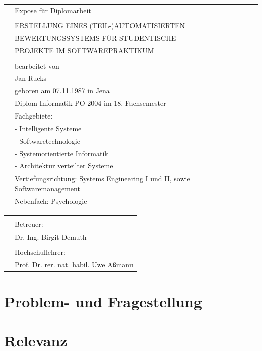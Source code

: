 \documentclass[a4paper,pointlessnumbers]{article}
\newcommand{\dinBoldXVI}{\fontencoding{OT1}\fontfamily{din}\fontseries{b}\fontsize{16pt}{19.2pt}\selectfont}
\begin{document}
\begin{titlepage}
	\begin{tabularx}{\textwidth}{@{}p{8mm}X}
	  & \univLightXI Expose für Diplomarbeit \\
	  & \\
	  & \LARGE\dinBoldXVI\MakeUppercase{Erstellung eines (teil-)automatisierten} \\   
	  & \LARGE\dinBoldXVI\MakeUppercase{Bewertungssystems für studentische} \\
	  & \LARGE\dinBoldXVI\MakeUppercase{Projekte im Softwarepraktikum} \\
	  & \\
	  & \univLightIX bearbeitet von \\
	  & \univLightXI Jan Rucks \\
	  & \univLightIX geboren am 07.11.1987 in Jena \\
	  & \univLightIX Diplom Informatik PO 2004 im 18. Fachsemester \\
	  & \univLightIX Fachgebiete: \\ 
	  & \univLightIX - Intelligente Systeme \\
	  & \univLightIX - Softwaretechnologie \\
	  & \univLightIX - Systemorientierte Informatik \\
	  & \univLightIX - Architektur verteilter Systeme \\
	  & \univLightIX Vertiefungsrichtung: Systems Engineering I und II, sowie Softwaremanagement \\ 
	  & \univLightIX Nebenfach: Psychologie \\
	\end{tabularx}
	\vfill
	\begin{tabularx}{\textwidth}{@{}p{8mm}X}
	  & \\
	  & \univLightIX Betreuer: \\
	  & \univLightXI Dr.-Ing. Birgit Demuth \\
	  & \\
	  & \univLightIX Hochschullehrer: \\
	  & \univLightXI Prof. Dr. rer. nat. habil. Uwe Aßmann \\
	\end{tabularx}
  \end{titlepage}

  \section{Problem- und Fragestellung}
      
  \section{Relevanz}
      
\end{document}
